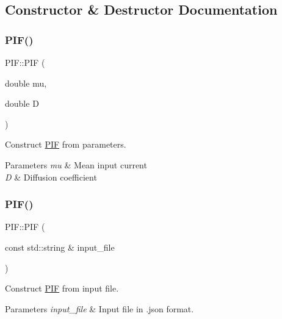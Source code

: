 \subsection{Constructor \& Destructor Documentation}
\mbox{\label{classPIF_ac3aaa22c006e70efc91de66078b2dbd2}} 
\subsubsection{\texorpdfstring{P\+I\+F()}{PIF()}\hspace{0.1cm}{\footnotesize\ttfamily [1/2]}}
{\footnotesize\ttfamily P\+I\+F\+::\+P\+IF (\begin{DoxyParamCaption}\item[{double}]{mu,  }\item[{double}]{D }\end{DoxyParamCaption})}



Construct \hyperlink{classPIF}{P\+IF} from parameters. 


\begin{DoxyParams}{Parameters}
{\em mu} & Mean input current \\
\hline
{\em D} & Diffusion coefficient \\
\hline
\end{DoxyParams}
\mbox{\label{classPIF_ad1a5859ea76a5ebd90d638ddea2bae90}} 
\subsubsection{\texorpdfstring{P\+I\+F()}{PIF()}\hspace{0.1cm}{\footnotesize\ttfamily [2/2]}}
{\footnotesize\ttfamily P\+I\+F\+::\+P\+IF (\begin{DoxyParamCaption}\item[{const std\+::string \&}]{input\+\_\+file }\end{DoxyParamCaption})}



Construct \hyperlink{classPIF}{P\+IF} from input file. 


\begin{DoxyParams}{Parameters}
{\em input\+\_\+file} & Input file in .json format. \\
\hline
\end{DoxyParams}


